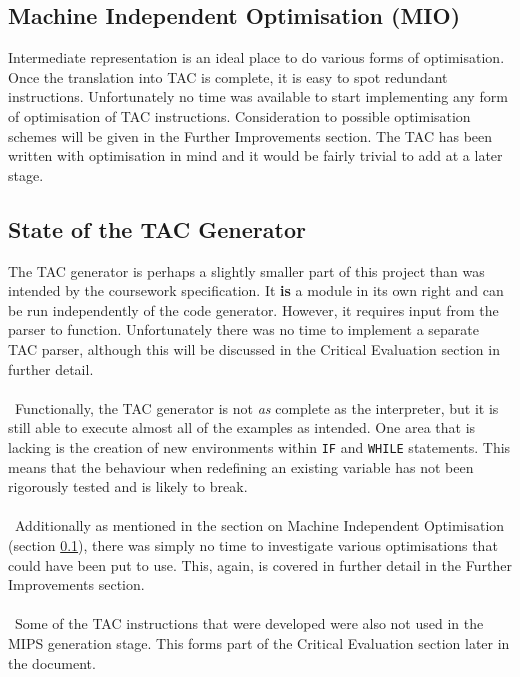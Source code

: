 \subsection{Machine Independent Optimisation (MIO)}
\label{sec:MIO}
Intermediate representation is an ideal place to do various forms of optimisation. Once the translation into TAC is complete, it is easy to spot redundant instructions. Unfortunately no time was available to start implementing any form of optimisation of TAC instructions. Consideration to possible optimisation schemes will be given in the Further Improvements section. The TAC has been written with optimisation in mind and it would be fairly trivial to add at a later stage.

\subsection{State of the TAC Generator}
The TAC generator is perhaps a slightly smaller part of this project than was intended by the coursework specification. It \textbf{is} a module in its own right and can be run independently of the code generator. However, it requires input from the parser to function. Unfortunately there was no time to implement a separate TAC parser, although this will be discussed in the Critical Evaluation section in further detail.
\\ \ \\ \
Functionally, the TAC generator is not \emph{as} complete as the interpreter, but it is still able to execute almost all of the examples as intended. One area that is lacking is the creation of new environments within \verb!IF! and \verb!WHILE! statements. This means that the behaviour when redefining an existing variable has not been rigorously tested and is likely to break.
\\ \ \\ \
Additionally as mentioned in the section on Machine Independent Optimisation (section \ref{sec:MIO}), there was simply no time to investigate various optimisations that could have been put to use. This, again, is covered in further detail in the Further Improvements section.
\\ \ \\ \
Some of the TAC instructions that were developed were also not used in the MIPS generation stage. This forms part of the Critical Evaluation section later in the document.